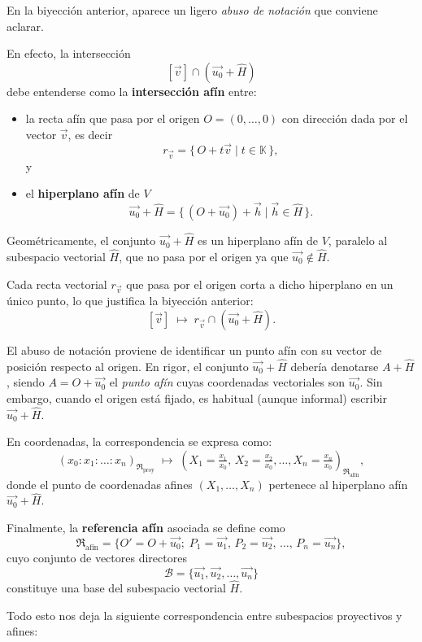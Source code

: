 En la biyección anterior, aparece un ligero \emph{abuso de notación} que conviene aclarar.

En efecto, la intersección
\[
[\vec{v}] \cap (\vec{u_0} + \hat{H})
\]
debe entenderse como la \textbf{intersección afín} entre:
\begin{itemize}
  \item la recta afín que pasa por el origen \(O = (0,\ldots,0)\) con dirección dada por el vector \(\vec{v}\), es decir
  \[
  r_{\vec{v}} = \{\, O+t\vec{v} \mid t \in \mathbb{K} \,\},
  \]
  y
  \item el \textbf{hiperplano afín} de \(V\)
  \[
  \vec{u_0} + \hat{H} = \{\, (O+\vec{u_0}) + \vec{h} \mid \vec{h} \in \hat{H} \,\}.
  \]
\end{itemize}

Geométricamente, el conjunto \(\vec{u_0} + \hat{H}\) es un hiperplano afín de \(V\), paralelo al subespacio vectorial \(\hat{H}\), que no pasa por el origen ya que \(\vec{u_0} \notin \hat{H}\). 

Cada recta vectorial \(r_{\vec{v}}\) que pasa por el origen corta a dicho hiperplano en un único punto, lo que justifica la biyección anterior:
\[
[\vec{v}] \;\longmapsto\; r_{\vec{v}} \cap (\vec{u_0} + \hat{H}).
\]

El abuso de notación proviene de identificar un punto afín con su vector de posición respecto al origen. En rigor, el conjunto \(\vec{u_0} + \hat{H}\) debería denotarse \(A + \hat{H}\), siendo \(A=O+ \vec{u_0}\) el \emph{punto afín} cuyas coordenadas vectoriales son \(\vec{u_0}\).  
Sin embargo, cuando el origen está fijado, es habitual (aunque informal) escribir \(\vec{u_0} + \hat{H}\).

En coordenadas, la correspondencia se expresa como:
\[
(x_0 : x_1 : \ldots : x_n)_{\mathfrak{R}_{\text{proy}}}
\;\longmapsto\;
(X_1 = \tfrac{x_1}{x_0}, \, X_2 = \tfrac{x_2}{x_0}, \ldots, X_n = \tfrac{x_n}{x_0})_{\mathfrak{R}_{\text{afín}}},
\]
donde el punto de coordenadas afines \((X_1, \ldots, X_n)\) pertenece al hiperplano afín \(\vec{u_0} + \hat{H}\).

\medskip

Finalmente, la \textbf{referencia afín} asociada se define como
\[
\mathfrak{R}_{\text{afín}} = 
\{ O' = O+\vec{u_0};\; P_1 = \vec{u_1},\, P_2 = \vec{u_2},\, \ldots,\, P_n = \vec{u_n} \},
\]
cuyo conjunto de vectores directores
\[
\mathcal{B} = \{ \vec{u_1}, \vec{u_2}, \ldots, \vec{u_n} \}
\]
constituye una base del subespacio vectorial \(\hat{H}\).

Todo esto nos deja la siguiente correspondencia entre subespacios proyectivos y afines:

